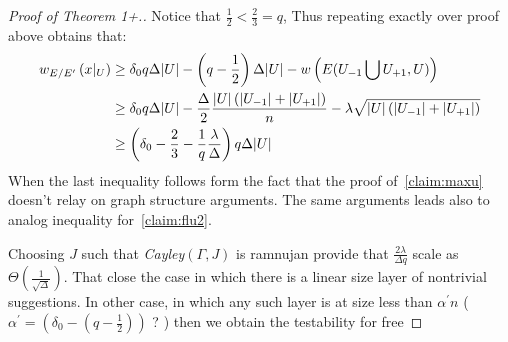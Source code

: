 \begin{proof}[Proof of Theorem 1+.] Notice that $\frac{1}{2} < \frac{2}{3} = q$, Thus repeating exactly over proof above obtains that: 
  \begin{equation*}
    \begin{split}
      w_{E/E^{\prime}}  \left( x|_{U} \right)  & \ge  \delta_{0}q\Delta|U| - \left( q - \frac{1}{2} \right)\Delta |U| - w\left( E(U_{-1} \bigcup U_{+1} ,U) \right)  \\ 
      & \ge   \delta_{0}q\Delta|U| - \frac{\Delta}{2} \frac{|U|\left( |U_{-1}| + |U_{+1}| \right)}{n} -\lambda\sqrt{|U|\left( |U_{-1}| + |U_{+1}| \right)} \\ 
      & \ge  \left( \delta_{0} - \frac{2}{3} - \frac{1}{q}\frac{\lambda}{\Delta} \right)q\Delta |U|
    \end{split}
  \end{equation*}
  When the last inequality follows form the fact that the proof of~\cref{claim:maxu} doesn't relay on graph structure arguments. The same arguments leads also to analog inequality for~\cref{claim:flu2}.

  Choosing $J$ such that \emph{Cayley}$\left( \Gamma, J \right)$ is ramnujan provide that $ \frac{2\lambda}{\Delta q}$ scale as $\Theta\left( \frac{1}{\sqrt{\Delta}} \right)$. That close the case in which there is a linear size layer of nontrivial suggestions. In other case, in which any such layer is at size less than $\alpha^{\prime}n$ ( $\alpha^{\prime} = \left( \delta_{0} - \left( q - \frac{1}{2} \right) \right)$ ? ) then we obtain the testability for free
\end{proof}



